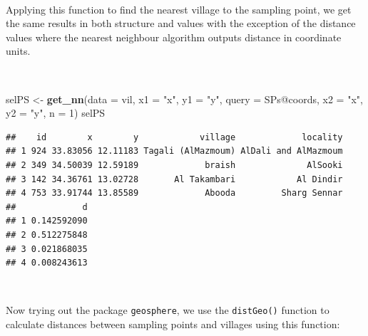 \documentclass[11pt,a4paper]{article}
\newenvironment{Shaded}{}{}
\newcommand{\KeywordTok}[1]{\textcolor[rgb]{0.00,0.44,0.13}{\textbf{#1}}}
\newcommand{\DataTypeTok}[1]{\textcolor[rgb]{0.56,0.13,0.00}{#1}}
\newcommand{\DecValTok}[1]{\textcolor[rgb]{0.25,0.63,0.44}{#1}}
\newcommand{\StringTok}[1]{\textcolor[rgb]{0.25,0.44,0.63}{#1}}
\newcommand{\OperatorTok}[1]{\textcolor[rgb]{0.40,0.40,0.40}{#1}}
\newcommand{\NormalTok}[1]{#1}
\begin{document}
~

Applying this function to find the nearest village to the sampling
point, we get the same results in both structure and values with the
exception of the distance values where the nearest neighbour algorithm
outputs distance in coordinate units.

~

\begin{Shaded}
\begin{Highlighting}[]
\NormalTok{selPS <-}\StringTok{ }\KeywordTok{get_nn}\NormalTok{(}\DataTypeTok{data =}\NormalTok{ vil, }\DataTypeTok{x1 =} \StringTok{"x"}\NormalTok{, }\DataTypeTok{y1 =} \StringTok{"y"}\NormalTok{, }
                \DataTypeTok{query =}\NormalTok{ SPs}\OperatorTok{@}\NormalTok{coords, }\DataTypeTok{x2 =} \StringTok{"x"}\NormalTok{, }\DataTypeTok{y2 =} \StringTok{"y"}\NormalTok{, }
                \DataTypeTok{n =} \DecValTok{1}\NormalTok{)}
\NormalTok{selPS}
\end{Highlighting}
\end{Shaded}

\begin{verbatim}
##    id        x        y            village             locality
## 1 924 33.83056 12.11183 Tagali (AlMazmoum) AlDali and AlMazmoum
## 2 349 34.50039 12.59189             braish              AlSooki
## 3 142 34.36761 13.02728       Al Takambari            Al Dindir
## 4 753 33.91744 13.85589             Abooda         Sharg Sennar
##             d
## 1 0.142592090
## 2 0.512275848
## 3 0.021868035
## 4 0.008243613
\end{verbatim}

~

Now trying out the package \texttt{geosphere}, we use the
\texttt{distGeo()} function to calculate distances between sampling
points and villages using this function:

~
\end{document}
